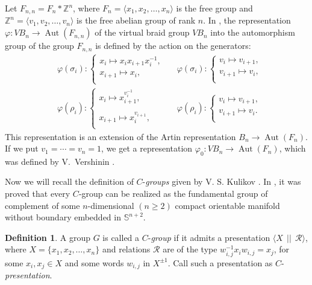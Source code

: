 \documentclass[11 pt, reqno]{amsart}
\theoremstyle{definition}
\newtheorem{definition}[theorem]{Definition}
\numberwithin{equation}{subsection}
\newcommand{\Aut}{\operatorname{Aut}}
\begin{document}
Let $F_{n,n} = F_n \ast \mathbb{Z}^n$, where $F_n=\langle x_1, x_2, \ldots,x_n \rangle$ is the free group and
$\mathbb{Z}^n = \langle v_1, v_2, \ldots, v_n \rangle$ is the free abelian group of rank $n$.
In \cite[Theorem 4.1]{BMN-1}, the representation
$\varphi: VB_n \rightarrow \Aut(F_{n,n})$ of the virtual braid group $VB _n$ into the automorphism group of the group $F_{n,n}$ is defined by the action on the generators:
\begin{align*}
&\varphi(\sigma_i) :
\left\{
\begin{array}{l}
  x_i \mapsto  x_i x_{i+1} x_i^{-1}, \\
  x_{i+1} \mapsto x_i,  \\
\end{array}
\right.~~~
&\varphi(\sigma_i) :
\left\{
\begin{array}{l}
  v_i \mapsto  v_{i+1}, \\
  v_{i+1} \mapsto v_i,  \\
\end{array}
\right.\\
&\varphi(\rho_i) :
\left\{
\begin{array}{l}
  x_i \mapsto  x_{i+1}^{v_i^{-1}}, \\
  \\
  x_{i+1} \mapsto x_i^{v_{i+1}},  \\
\end{array}
\right.~~~
&\varphi(\rho_i) :
\left\{
\begin{array}{l}
  v_i \mapsto  v_{i+1}, \\
  v_{i+1} \mapsto v_i . \\
\end{array}
\right.
\end{align*}
This representation is an extension of the Artin representation $B_n \to  \Aut(F_{n})$. If we put $v_1 = \cdots = v_n = 1$, we get a representation $\varphi_0 : VB_n \to \Aut(F_{n})$, which was defined by V.~Vershinin \cite{VV-1}.
\par

Now we will recall the definition of $C$-{\it groups} given by V. S. Kulikov \cite{Kulikov-1, Kulikov-2}. In \cite{Kulikov-2}, it was proved that every $C$-group can be realized as the fundamental group of complement of some $n$-dimensional $(n \geq 2)$ compact orientable manifold without boundary embedded in $\mathbb{S}^{n+2}$.

\begin{definition}
A group $G$ is called a $C$-{\it group} if it admits a presentation $\langle X~~||~~\mathcal{R} \rangle$, where $X=\{x_1, x_2, \ldots, x_n\}$ and relations $\mathcal{R}$ are of the type $w_{i,j}^{-1} x_i w_{i,j} = x_j$, for some $x_i, x_j  \in X$ and some words $w_{i,j}$ in $X^{\pm 1}$. Call such a presentation as $C$-{\it presentation}.
\end{definition}
\end{document}
